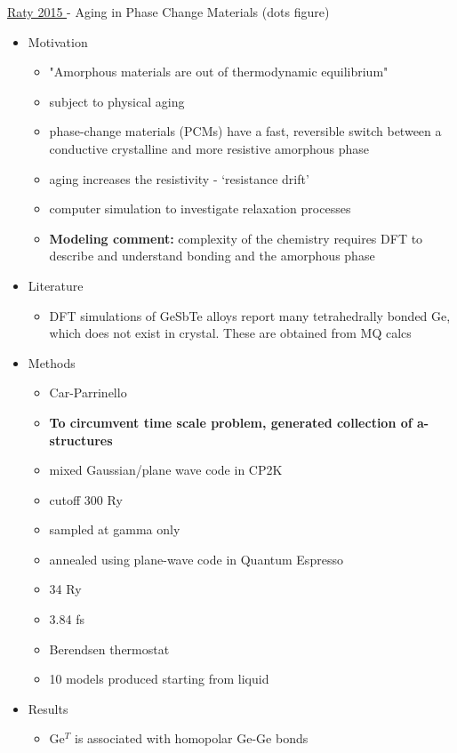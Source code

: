 \documentclass[3p,review,12pt]{elsarticle}
\begin{document}
\underline{Raty 2015 \cite{Raty2015}} - Aging in Phase Change Materials (dots figure)
\par
\begin{itemize}
	\item Motivation
	\begin{itemize}
		\item "Amorphous materials are out of thermodynamic equilibrium"
		\item subject to physical aging
		\item phase-change materials (PCMs) have a fast, reversible switch between a conductive crystalline and more resistive amorphous phase
		\item aging increases the resistivity - `resistance drift'
		\item computer simulation to investigate relaxation processes
		\item \textbf{Modeling comment:} complexity of the chemistry requires DFT to describe and understand bonding and the amorphous phase
	\end{itemize}
	\item Literature
	\begin{itemize}
		\item DFT simulations of GeSbTe alloys report many tetrahedrally bonded Ge, which does not exist in crystal. These are obtained from MQ calcs
	\end{itemize}
	\item Methods
	\begin{itemize}
		\item Car-Parrinello
		\item \textbf{To circumvent time scale problem, generated collection of a-structures}
		\item mixed Gaussian/plane wave code in CP2K
		\item cutoff 300 Ry
		\item sampled at gamma only
		\item annealed using plane-wave code in Quantum Espresso
		\item 34 Ry
		\item 3.84 fs
		\item Berendsen thermostat
		\item 10 models produced starting from liquid
	\end{itemize}	
	\item Results
	\begin{itemize}
		\item Ge$^{T}$ is associated with homopolar Ge-Ge bonds

\end{itemize}
\end{itemize}
\end{document}
